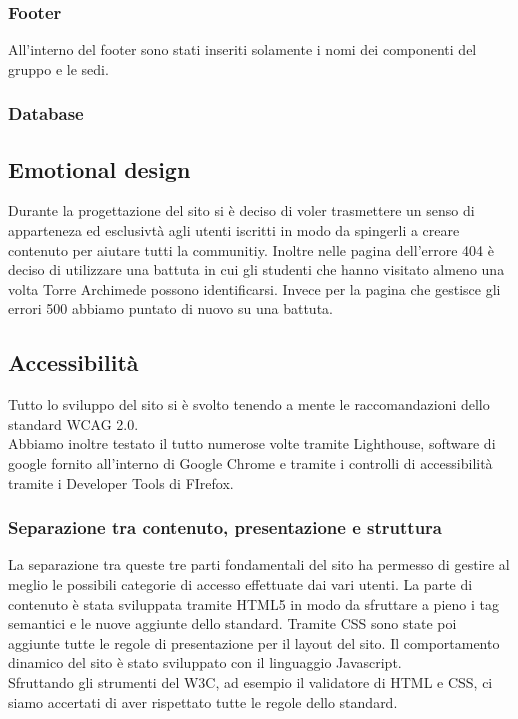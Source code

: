 \subsubsection{Footer}
All'interno del footer sono stati inseriti solamente i nomi dei componenti del gruppo e le sedi.

\subsubsection{Database}

\subsection{Emotional design}
Durante la progettazione del sito si è deciso di voler trasmettere un senso di apparteneza ed esclusivtà agli utenti iscritti in modo da spingerli a creare contenuto per aiutare tutti la communitiy.
Inoltre nelle pagina dell'errore 404 è deciso di utilizzare una battuta in cui gli studenti che hanno visitato almeno una volta Torre Archimede possono identificarsi. Invece per la pagina che gestisce gli errori 500 abbiamo puntato di nuovo su una battuta.

\subsection{Accessibilità}
Tutto lo sviluppo del sito si è svolto tenendo a mente le raccomandazioni dello standard WCAG 2.0.\\Abbiamo inoltre testato il tutto numerose volte tramite Lighthouse, software di google fornito all'interno di Google Chrome e tramite i controlli di accessibilità tramite i Developer Tools di FIrefox.

\subsubsection{Separazione tra contenuto, presentazione e struttura}
La separazione tra queste tre parti fondamentali del sito ha permesso di gestire al meglio le possibili categorie di accesso effettuate dai vari utenti. La parte di contenuto è stata sviluppata tramite HTML5 in modo da sfruttare a pieno i tag semantici e le nuove aggiunte dello standard. Tramite CSS sono state poi aggiunte tutte le regole di presentazione per il layout del sito. Il comportamento dinamico del sito è stato sviluppato con il linguaggio Javascript.\\ Sfruttando gli strumenti del W3C, ad esempio il validatore di HTML e CSS, ci siamo accertati di aver rispettato tutte le regole dello standard.

